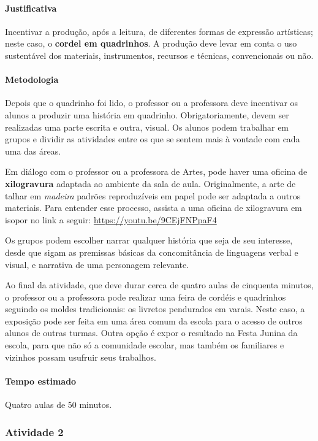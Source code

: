 \documentclass[11pt]{extarticle}
\begin{document}
\paragraph{Justificativa} Incentivar a produção, após a leitura, de diferentes formas de 
expressão artísticas; neste caso, o \textbf{cordel em quadrinhos}. A produção 
deve levar em conta o uso sustentável dos materiais, instrumentos, recursos e técnicas,
convencionais ou não.


\paragraph{Metodologia}

Depois que o quadrinho foi lido, o professor ou a professora deve incentivar os alunos
a produzir uma história em quadrinho. Obrigatoriamente, devem ser realizadas uma parte
escrita e outra, visual. Os alunos podem trabalhar em grupos e dividir as atividades
entre os que se sentem mais à vontade com cada uma das áreas.

Em diálogo com o professor ou a professora de Artes, pode haver uma oficina de \textbf{xilogravura}
adaptada ao ambiente da sala de aula. Originalmente, a arte de talhar em \textit{madeira} padrões
reproduzíveis em papel pode ser adaptada a outros materiais. Para entender esse processo, assista a uma oficina de xilogravura em isopor no link a seguir: \url{https://youtu.be/9CEjFNPpaF4}  

Os grupos podem escolher narrar qualquer história que seja de seu interesse,
desde que sigam as premissas básicas da concomitância de linguagens verbal e visual, e 
narrativa de uma personagem relevante. 

Ao final da atividade, que deve durar cerca de quatro aulas de cinquenta minutos,
 o professor ou a professora pode realizar uma feira de cordéis e quadrinhos
 seguindo os moldes tradicionais: os livretos pendurados em varais.
 Neste caso, a exposição pode ser feita em uma área comum da escola para o acesso de outros alunos
 de outras turmas. Outra opção é expor o resultado na Festa Junina da escola, para que não só a comunidade
 escolar, mas também os familiares e vizinhos possam usufruir seus trabalhos.


\paragraph{Tempo estimado} Quatro aulas de 50 minutos.

\subsubsection{Atividade 2}
\end{document}
